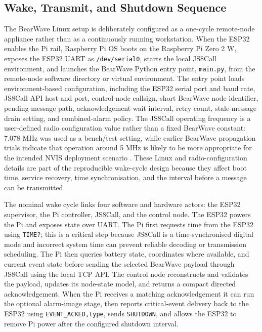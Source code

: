 \documentclass[acmsmall,screen]{acmart}
\begin{document}
\subsection{Wake, Transmit, and Shutdown Sequence}
The BearWave Linux setup is deliberately configured as a one-cycle remote-node appliance rather than as a continuously running workstation. When the ESP32 enables the Pi rail, Raspberry Pi OS boots on the Raspberry Pi Zero 2 W, exposes the ESP32 UART as \texttt{/dev/serial0}, starts the local JS8Call environment, and launches the BearWave Python entry point, \texttt{main.py}, from the remote-node software directory or virtual environment. The entry point loads environment-based configuration, including the ESP32 serial port and baud rate, JS8Call API host and port, control-node callsign, short BearWave node identifier, pending-message path, acknowledgement wait interval, retry count, stale-message drain setting, and combined-alarm policy. The JS8Call operating frequency is a user-defined radio configuration value rather than a fixed BearWave constant: 7.078 MHz was used as a bench/test setting, while earlier BearWave propagation trials indicate that operation around 5 MHz is likely to be more appropriate for the intended NVIS deployment scenario \cite{ButterworthMarkAndrew2025ERCi}. These Linux and radio-configuration details are part of the reproducible wake-cycle design because they affect boot time, service recovery, time synchronisation, and the interval before a message can be transmitted.

The nominal wake cycle links four software and hardware actors: the ESP32 supervisor, the Pi controller, JS8Call, and the control node. The ESP32 powers the Pi and exposes state over UART. The Pi first requests time from the ESP32 using \texttt{TIME?}; this is a critical step because JS8Call is a time-synchronised digital mode and incorrect system time can prevent reliable decoding or transmission scheduling. The Pi then queries battery state, coordinates where available, and current event state before sending the selected BearWave payload through JS8Call using the local TCP API. The control node reconstructs and validates the payload, updates its node-state model, and returns a compact directed acknowledgement. When the Pi receives a matching acknowledgement it can run the optional alarm-image stage, then reports critical-event delivery back to the ESP32 using \texttt{EVENT\_ACKED,type}, sends \texttt{SHUTDOWN}, and allows the ESP32 to remove Pi power after the configured shutdown interval.
\end{document}
